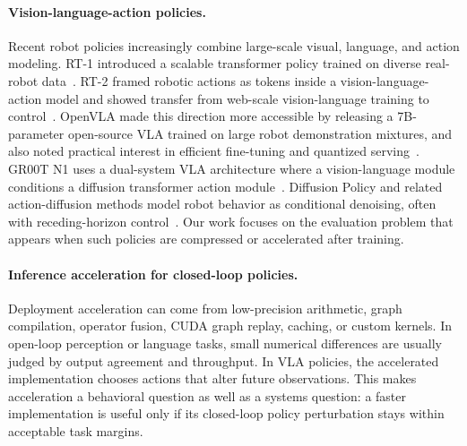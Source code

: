 \documentclass[10pt]{article}
\begin{document}
\paragraph{Vision-language-action policies.}
Recent robot policies increasingly combine large-scale visual, language, and action modeling. RT-1 introduced a scalable transformer policy trained on diverse real-robot data~\citep{rt1}. RT-2 framed robotic actions as tokens inside a vision-language-action model and showed transfer from web-scale vision-language training to control~\citep{rt2}. OpenVLA made this direction more accessible by releasing a 7B-parameter open-source VLA trained on large robot demonstration mixtures, and also noted practical interest in efficient fine-tuning and quantized serving~\citep{openvla}. GR00T N1 uses a dual-system VLA architecture where a vision-language module conditions a diffusion transformer action module~\citep{grootn1}. Diffusion Policy and related action-diffusion methods model robot behavior as conditional denoising, often with receding-horizon control~\citep{diffusionpolicy}. Our work focuses on the evaluation problem that appears when such policies are compressed or accelerated after training.

\paragraph{Inference acceleration for closed-loop policies.}
Deployment acceleration can come from low-precision arithmetic, graph compilation, operator fusion, CUDA graph replay, caching, or custom kernels. In open-loop perception or language tasks, small numerical differences are usually judged by output agreement and throughput. In VLA policies, the accelerated implementation chooses actions that alter future observations. This makes acceleration a behavioral question as well as a systems question: a faster implementation is useful only if its closed-loop policy perturbation stays within acceptable task margins.
\end{document}
